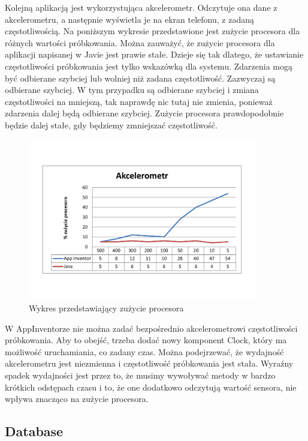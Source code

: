 Kolejną aplikacją jest wykorzystująca akcelerometr. Odczytuje ona dane z akcelerometru, a następnie wyświetla je na ekran telefonu, z zadaną częstotliwością. Na poniższym wykresie przedstawione jest zużycie procesora dla różnych wartości próbkowania. Można zauważyć, że zużycie procesora dla aplikacji napisanej w Javie jest prawie stałe. Dzieje się tak dlatego, że ustawianie częstotliwości próbkowania jest tylko wskazówką dla systemu. Zdarzenia mogą być odbierane szybciej lub wolniej niż zadana częstotliwość. Zazwyczaj są odbierane szybciej. W tym przypadku są odbierane szybciej i zmiana częstotliwości na mniejszą, tak naprawdę nic tutaj nie zmienia, ponieważ zdarzenia dalej będą odbierane szybciej. Zużycie procesora prawdopodobnie będzie dalej stałe, gdy będziemy zmniejszać częstotliwość.\cite{doc:android}

\begin{figure}[H]
\centering\includegraphics[width=10cm]{figures/apps/accelerometerChart}
\caption{Wykres przedstawiający zużycie procesora}
\end{figure}

W AppInventorze nie można zadać bezpośrednio akcelerometrowi częstotliwości próbkowania. Aby to obejść, trzeba dodać nowy komponent Clock, który ma możliwość uruchamiania, co zadany czas. Można podejrzewać, że wydajność akcelerometru jest niezmienna i częstotliwość próbkowania jest stała. Wyraźny spadek wydajności jest przez to, że musimy wywoływać metody w bardzo krótkich odstępach czasu i to, że one dodatkowo odczytują wartość sensora, nie wpływa znacząco na zużycie procesora.


\subsection{Database}

